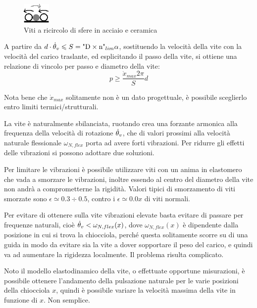 \begin{figure}[h]
    \centering
    \includegraphics[width=0.12\textwidth]{Immagini/Viti_A_C.png}
    \caption{Viti a ricircolo di sfere in acciaio e ceramica}
\end{figure}

A partire da \( d\cdot \dot{\theta}_v \leqslant S = \text{"D}\times \text{n"}_{lim} \alpha \), sostituendo la velocità della vite con la velocità del carico traslante, ed esplicitando il passo della vite, si ottiene una relazione di vincolo per passo e diametro della vite:
\[ p \geqslant \frac{\dot{x}_{max} 2\pi }{S} d \]

Nota bene che \(\dot{x}_{max}\) solitamente non è un dato progettuale, è possibile sceglierlo entro limiti termici/strutturali.

La vite è naturalmente sbilanciata, ruotando crea una forzante armonica alla frequenza della velocità di rotazione \( \dot{\theta}_v \), che di valori prossimi alla velocità naturale flessionale \(\omega_{N,flex}\) porta ad avere forti vibrazioni.
Per ridurre gli effetti delle vibrazioni si possono adottare due soluzioni.

Per limitare le vibrazioni è possibile utilizzare viti con un anima in elastomero che vada a smorzare le vibrazioni, inoltre essendo al centro del diametro della vite non andrà a comprometterne la rigidità. Valori tipici di smorzamento di viti smorzate sono \(\epsilon \simeq 0.3 \div 0.5\), contro i \(\epsilon \simeq 0.0x \) di viti normali.

Per evitare di ottenere sulla vite vibrazioni elevate basta evitare di passare per frequenze naturali, cioè \( \dot{\theta}_v < \omega_{N,flex}(x) \), dove \( \omega_{N,flex}(x) \) è dipendente dalla posizione in cui si trova la chiocciola, perché questa solitamente scorre su di una guida in modo da evitare sia la vite a dover sopportare il peso del carico, e quindi va ad aumentare la rigidezza localmente. Il problema risulta complicato.

Noto il modello elastodinamico della vite, o effettuate opportune misurazioni, è possibile ottenere l'andamento della pulsazione naturale per le varie posizioni della chiocciola \(x\), quindi è possibile variare la  velocità massima della vite in funzione di \(x\). Non semplice.

